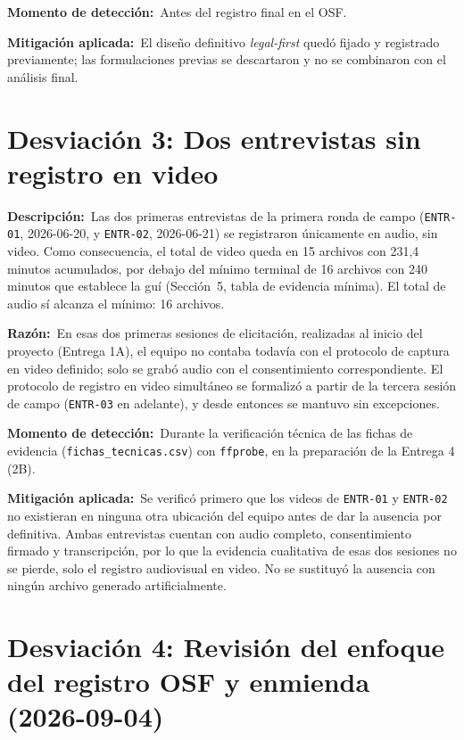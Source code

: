 \documentclass[11pt,a4paper]{article}
\begin{document}
\textbf{Momento de detecci\'{o}n:}~Antes del registro final en el OSF.

\textbf{Mitigaci\'{o}n aplicada:}~El dise\~{n}o definitivo \emph{legal-first}
qued\'{o} fijado y registrado previamente; las formulaciones previas se
descartaron y no se combinaron con el an\'{a}lisis final.

\section*{Desviaci\'{o}n 3: Dos entrevistas sin registro en video}

\textbf{Descripci\'{o}n:}~Las dos primeras entrevistas de la primera ronda de
campo (\texttt{ENTR-01}, 2026-06-20, y \texttt{ENTR-02}, 2026-06-21) se
registraron \'{u}nicamente en audio, sin video. Como consecuencia, el total de
video queda en 15 archivos con 231,4 minutos acumulados, por debajo del
m\'{i}nimo terminal de 16 archivos con 240 minutos que establece la gu\'{i}
(Secci\'{o}n~5, tabla de evidencia m\'{i}nima). El total de audio s\'{i} alcanza
el m\'{i}nimo: 16 archivos.

\textbf{Raz\'{o}n:}~En esas dos primeras sesiones de elicitaci\'{o}n, realizadas
al inicio del proyecto (Entrega 1A), el equipo no contaba todav\'{i}a con el
protocolo de captura en video definido; solo se grab\'{o} audio con el
consentimiento correspondiente. El protocolo de registro en video simult\'{a}neo
se formaliz\'{o} a partir de la tercera sesi\'{o}n de campo (\texttt{ENTR-03} en
adelante), y desde entonces se mantuvo sin excepciones.

\textbf{Momento de detecci\'{o}n:}~Durante la verificaci\'{o}n t\'{e}cnica de las
fichas de evidencia (\texttt{fichas\_tecnicas.csv}) con \texttt{ffprobe}, en la
preparaci\'{o}n de la Entrega 4 (2B).

\textbf{Mitigaci\'{o}n aplicada:}~Se verific\'{o} primero que los videos de
\texttt{ENTR-01} y \texttt{ENTR-02} no existieran en ninguna otra
ubicaci\'{o}n del equipo antes de dar la ausencia por definitiva. Ambas
entrevistas cuentan con audio completo, consentimiento firmado y
transcripci\'{o}n, por lo que la evidencia cualitativa de esas dos sesiones no se
pierde, solo el registro audiovisual en video. No se sustituy\'{o} la ausencia
con ning\'{u}n archivo generado artificialmente.

\section*{Desviaci\'{o}n 4: Revisi\'{o}n del enfoque del registro OSF y enmienda (2026-09-04)}
\end{document}
